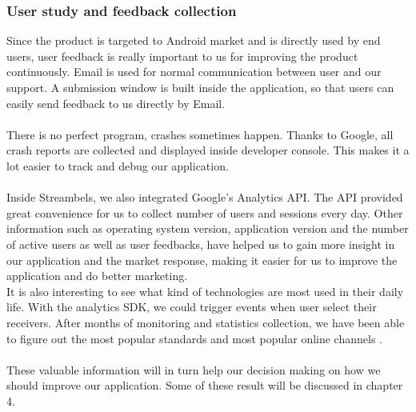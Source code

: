\subsubsection{User study and feedback collection}
Since the product is targeted to Android market and is directly used by end users, user feedback is really important to us for improving the product continuously. Email is used for normal communication between user and our support. A submission window is built inside the application, so that users can easily send feedback to us directly by Email.\\
\\
There is no perfect program, crashes sometimes happen. Thanks to Google, all crash reports are collected and displayed inside developer console. This makes it a lot easier to track and debug our application.\\
\\
Inside Streambels, we also integrated Google's Analytics API. The API provided great convenience for us to collect number of users and sessions every day. Other information such as operating system version, application version and the number of active users as well as user feedbacks, have helped us to gain more insight in our application and the market response, making it easier for us to improve the application and do better marketing. 
\\
It is also interesting to see what kind of technologies are most used in their daily life. With the analytics SDK, we could trigger events when user select their receivers. After months of monitoring and statistics collection, we have been able to figure out the most popular standards and most popular online channels .\\
\\
These valuable information will in turn help our decision making on how we should improve our application. Some of these result will be discussed in chapter 4.
